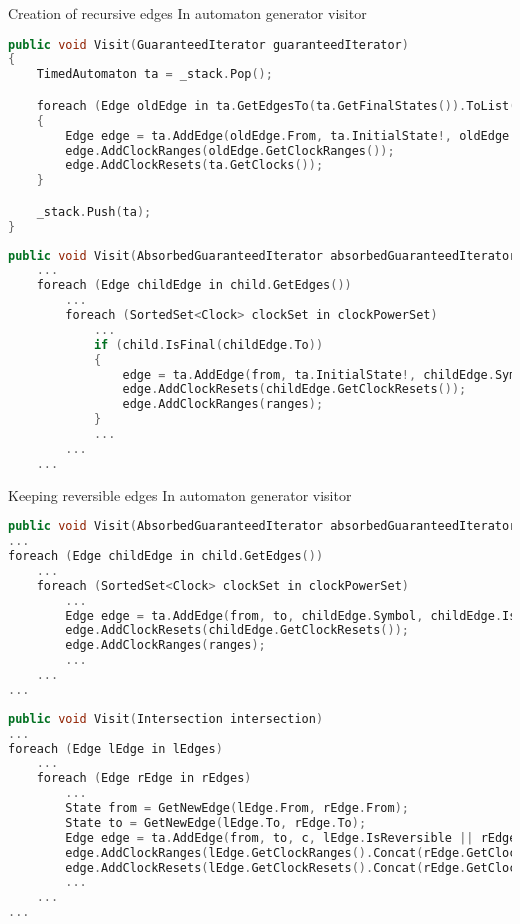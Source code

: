 \begin{frame}[fragile]{Creation of recursive edges}
    In automaton generator visitor
    \begin{lstlisting}[language=c++,basicstyle=\tiny]
public void Visit(GuaranteedIterator guaranteedIterator)
{
    TimedAutomaton ta = _stack.Pop();

    foreach (Edge oldEdge in ta.GetEdgesTo(ta.GetFinalStates()).ToList())
    {
        Edge edge = ta.AddEdge(oldEdge.From, ta.InitialState!, oldEdge.Symbol, true);
        edge.AddClockRanges(oldEdge.GetClockRanges());
        edge.AddClockResets(ta.GetClocks());
    }

    _stack.Push(ta);
}
    \end{lstlisting}
    \begin{lstlisting}[language=c++,basicstyle=\tiny]
public void Visit(AbsorbedGuaranteedIterator absorbedGuaranteedIterator)
    ...
    foreach (Edge childEdge in child.GetEdges())
        ...
        foreach (SortedSet<Clock> clockSet in clockPowerSet)
            ...    
            if (child.IsFinal(childEdge.To))
            {
                edge = ta.AddEdge(from, ta.InitialState!, childEdge.Symbol, true);
                edge.AddClockResets(childEdge.GetClockResets());
                edge.AddClockRanges(ranges);
            }
            ...
        ...
    ...
    \end{lstlisting}
\end{frame}

\begin{frame}[fragile]{Keeping reversible edges}
    In automaton generator visitor
    \begin{lstlisting}[language=c++,basicstyle=\tiny]
public void Visit(AbsorbedGuaranteedIterator absorbedGuaranteedIterator)
...
foreach (Edge childEdge in child.GetEdges())
    ...
    foreach (SortedSet<Clock> clockSet in clockPowerSet)
        ...
        Edge edge = ta.AddEdge(from, to, childEdge.Symbol, childEdge.IsReversible);
        edge.AddClockResets(childEdge.GetClockResets());
        edge.AddClockRanges(ranges);
        ...
    ...
...
    \end{lstlisting}
    
    \begin{lstlisting}[language=c++,basicstyle=\tiny]
public void Visit(Intersection intersection)
...
foreach (Edge lEdge in lEdges)
    ...
    foreach (Edge rEdge in rEdges)
        ...
        State from = GetNewEdge(lEdge.From, rEdge.From);
        State to = GetNewEdge(lEdge.To, rEdge.To);
        Edge edge = ta.AddEdge(from, to, c, lEdge.IsReversible || rEdge.IsReversible);
        edge.AddClockRanges(lEdge.GetClockRanges().Concat(rEdge.GetClockRanges()));
        edge.AddClockResets(lEdge.GetClockResets().Concat(rEdge.GetClockResets()));
        ...
    ...
...
    \end{lstlisting}
\end{frame}

